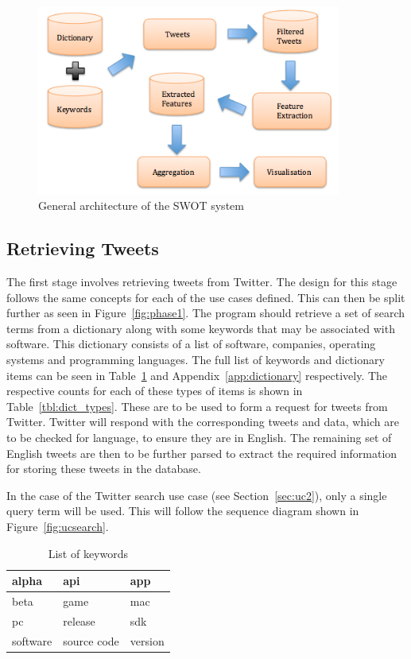 \begin{figure}[h!]
\begin{center}
\includegraphics[width=10cm]{design}
\end{center}
\caption{General architecture of the SWOT system}
\label{fig:general}
\end{figure}

\subsection{Retrieving Tweets}
\label{sec:arc1}
The first stage involves retrieving tweets from Twitter. The design for this stage follows the same concepts for each of the use cases defined. This can then be split further as seen in Figure~\ref{fig:phase1}. The program should retrieve a set of search terms from a dictionary along with some keywords that may be associated with software. This dictionary consists of a list of software, companies, operating systems and programming languages. The full list of keywords and dictionary items can be seen in Table~\ref{tbl:keywords} and Appendix~\ref{app:dictionary} respectively. The respective counts for each of these types of items is shown in Table~\ref{tbl:dict_types}.
These are to be used to form a request for tweets from Twitter. Twitter will respond with the corresponding tweets and data, which are to be checked for language, to ensure they are in English. The remaining set of English tweets are then to be further parsed to extract the required information for storing these tweets in the database.

In the case of the Twitter search use case (see Section~\ref{sec:uc2}), only a single query term will be used. This will follow the sequence diagram shown in Figure~\ref{fig:ucsearch}.

\begin{table}[h]
\begin{center}
\begin{tabular}{|l|l|l|}\hline
alpha&api&app\\\hline
beta&game&mac\\\hline
pc&release&sdk\\\hline
software&source code&version\\\hline
\end{tabular}
\end{center}
\caption{List of keywords}
\label{tbl:keywords}
\end{table}

